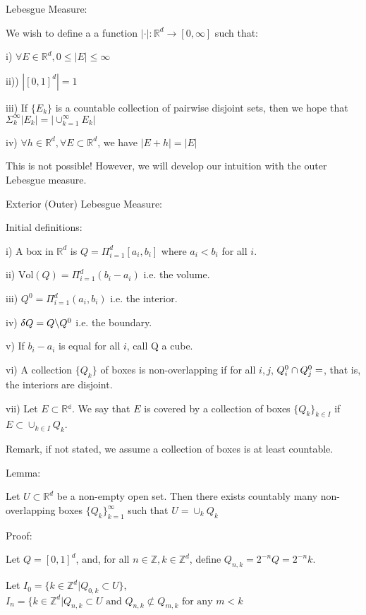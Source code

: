 \documentclass[10pt]{article}
\begin{document}
Lebesgue Measure:

We wish to define a a function $|\cdot|: \mathbb{R}^d \rightarrow [0,\infty]$ such that:

i) $\forall E \in \mathbb{R}^d, 0 \leq |E| \leq \infty$

ii)) $|[0,1]^d| = 1$

iii) If $\{ E_k\}$ is a countable collection of pairwise disjoint sets, then we hope that $\Sigma_{k}^{\infty} |E_k| = |\cup_{k=1}^{\infty} E_k |$

iv) $\forall h \in \mathbb{R}^d, \forall E \subset \mathbb{R}^d$, we have $|E+h| = |E|$ 

This is not possible! However, we will develop our intuition with the outer Lebesgue measure.

Exterior (Outer) Lebesgue Measure:

Initial definitions:

i) A box in $\mathbb{R}^d$ is $Q = \Pi_{i=1}^{d} [a_i,b_i]$ where $a_i < b_i$ for all $i$.

ii) $\text{Vol}(Q) = \Pi_{i=1}^{d} (b_i - a_i)$ i.e. the volume.

iii) $Q^0 = \Pi_{i=1}^{d} (a_i,b_i)$ i.e. the interior.

iv) $\delta Q = Q \symbol{92} Q^0$ i.e. the boundary.

v) If $b_i - a_i$ is equal for all $i$, call Q a cube.

vi) A collection $\{Q_k\}$ of boxes is non-overlapping if for all $i,j$, $Q_i^0 \cap Q_j^0 = \empty$, that is, the interiors are disjoint.

vii) Let $E \subset \mathbb{R{^d}}$. We say that $E$ is covered by a collection of boxes $\{ Q_k \}_{k \in I}$ if $E \subset \cup_{k \in I} Q_k$. 

Remark, if not stated, we assume a collection of boxes is at least countable.

Lemma:

Let $U \subset \mathbb{R}^d$ be a non-empty open set. Then there exists countably many non-overlapping boxes $\{Q_k\}_{k=1}^{\infty}$ such that $U = \cup_k Q_k$

Proof:

Let $Q = [0,1]^d$, and, for all $n \in \mathbb{Z}, k \in \mathbb{Z}^d$, define $Q_{n,k} = 2^{-n} Q = 2^{-n} k$.

Let $I_0 = \{ k\in \mathbb{Z}^d | Q_{0,k} \subset U\}$, $I_n = \{ k \in \mathbb{Z}^d | Q_{n,k} \subset U \text{ and } Q_{n,k} \not\subset Q_{m,k} \text{ for any } m < k$
\end{document}
